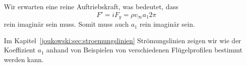 Wir erwarten eine reine Auftriebskraft, was bedeutet, dass
\[
	F'
	=
	i F_y
	=
	\rho v_\infty a_1 2 \pi
\]
rein imaginär sein muss. Somit muss auch $a_1$ rein imaginär sein.

Im Kapitel~\ref{joukowski:sec:stroemungslinien} Strömungslinien zeigen wir wie der Koeffizient $a_1$ anhand von Beispielen von verschiedenen Flügelprofilen bestimmt werden kann.